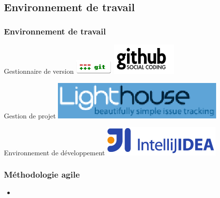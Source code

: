 \subsection{Environnement de travail}
\begin{frame}\frametitle{Environnement de travail}
\begin{minipage}[c]{.46\linewidth}
	\begin{beamerboxesrounded}[shadow=true,center]{Gestionnaire de version}
		\centering
		\includegraphics[width=.4\linewidth]{../image/gitLogo.png}
		\includegraphics[width=.3\linewidth]{../image/githubLogo.png}
	\end{beamerboxesrounded}
\end{minipage}
\hfill
\begin{minipage}[c]{.46\linewidth}
\begin{beamerboxesrounded}[shadow=true]{Gestion de projet}
	\centering
	\includegraphics[width=.7\linewidth]{../image/lighthouseLogo.png}
\end{beamerboxesrounded}
\end{minipage}
\vfill
\hfil
\begin{minipage}[c]{.6\linewidth}
\begin{beamerboxesrounded}[shadow=true]{Environnement de développement}
	\centering
	\includegraphics[width=.4\linewidth]{../image/intellijLogo.png}
\end{beamerboxesrounded}
\end{minipage}
\end{frame}
\begin{frame}\frametitle{Méthodologie agile}
\begin{itemize}
 \item 
\end{itemize}

\end{frame}
